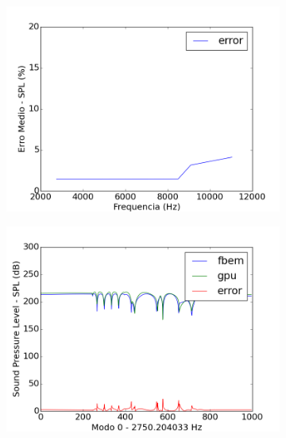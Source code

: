 \begin{figure}[ht]
\centering
\begin{subfigure}{0.6\textwidth}
	\centering
	\includegraphics[width=\textwidth]{../data/transfer_test/steel_key/plots/steel_key_error.png}
	\caption{}\label{fig:coef_key_err}
\end{subfigure}
\begin{subfigure}{0.5\textwidth}
	\centering
	\includegraphics[width=\textwidth]{../data/transfer_test/steel_key/plots/steel_key-tfv-0_0.png}
	\label{fig:coef_key_0}
\end{subfigure}%
\begin{subfigure}{0.5\textwidth}
	\centering

\end{subfigure}
\end{figure}
